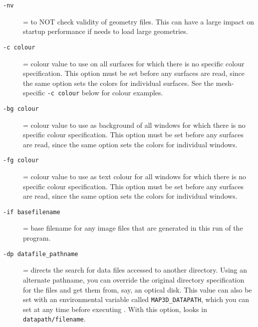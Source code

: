 \begin{description}
  \item[{\tt -nv}] = to NOT check validity of geometry files.  This can
    have a large impact on startup performance if \map{} needs to
    load large geometries.
    
  \item [{\tt -c colour}] = colour value to use on all
    surfaces for which there is no specific colour specification.  
    This option must be set before any surfaces are read, since the 
    same option sets the colors for individual surfaces.  See the 
    mesh-specific {\tt -c colour} below for colour examples. 
    
  \item [{\tt -bg colour}] = colour value to use as background of all
    windows for which there is no specific colour specification.  
    This option must be set before any surfaces are read, since the 
    same option sets the colors for individual windows.
    
  \item [{\tt -fg colour}] = colour value to use as text colour for all
    windows for which there is no specific colour specification.  
    This option must be set before any surfaces are read, since the 
    same option sets the colors for individual windows.
    

  \item [{\tt -if basefilename}] = base filename for any image files that
        are generated in this run of the program.

  \item[{\tt -dp datafile\_pathname}] = directs the search for data files
        accessed to another directory.  Using an alternate pathname, 
        you can override the
        original directory specification for the files and get them from,
        say, an optical disk.  This value can also be set with an
        environmental variable called {\tt MAP3D\_DATAPATH}, which you can
        set at any time before executing \map{}.  With this option, \map{}
        looks in {\tt datapath/filename}.



\end{description}
